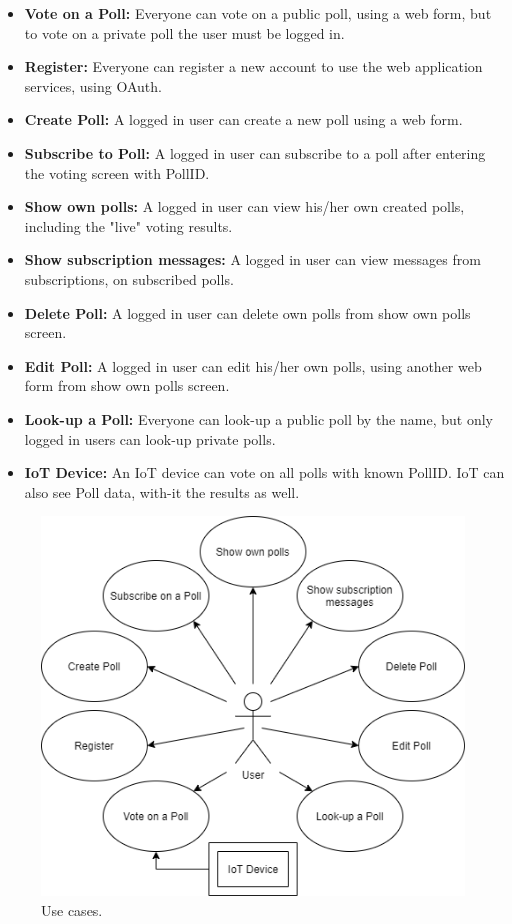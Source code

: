 \begin{itemize}
  \item \textbf{Vote on a Poll:} Everyone can vote on a public poll, using a web form, but to vote on a private poll the user must be logged in.
  \item \textbf{Register:} Everyone can register a new account to use the web application services, using OAuth.
  \item \textbf{Create Poll:} A logged in user can create a new poll using a web form.
  \item \textbf{Subscribe to Poll:} A logged in user can subscribe to a poll after entering the voting screen with PollID.
  \item \textbf{Show own polls:} A logged in user can view his/her own created polls, including the "live" voting results.
  \item \textbf{Show subscription messages:} A logged in user can view messages from subscriptions, on subscribed polls.
  \item \textbf{Delete Poll:} A logged in user can delete own polls from show own polls screen.
  \item \textbf{Edit Poll:} A logged in user can edit his/her own polls, using another web form from show own polls screen.
  \item \textbf{Look-up a Poll:} Everyone can look-up a public poll by the name, but only logged in users can look-up private polls.
  \item \textbf{IoT Device:} An IoT device can vote on all polls with known PollID. IoT can also see Poll data, with-it the results as well.
\end{itemize}
\begin{figure}[H]
  \centering
  \includegraphics[scale=0.5]{figs/usecases.png}
  \caption[scale=0.5]{Use cases.}
  \label{fig:usecases}
\end{figure}

